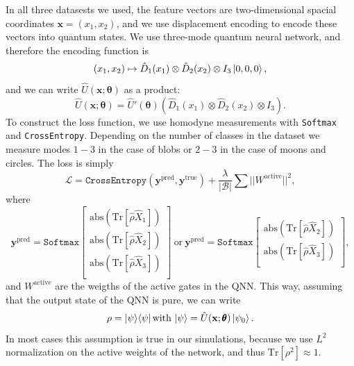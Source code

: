 \documentclass[12pt, a4paper,  nobibnotes]{article}
\newcommand{\op}[1]{\hat{#1}}
\newcommand{\ketbra}[2]{|#1\rangle\langle#2|}
\newcommand{\Tr}[1]{\mathrm{Tr}\left[#1\right]}
\begin{document}
In all three datasests we used, the feature vectors are two-dimensional spacial coordinates
$\mathbf x = (x_1,x_2)$, and we use displacement encoding to encode these vectors into quantum states.
We use three-mode quantum neural network, and therefore the encoding function is 
\begin{equation}
    (x_1, x_2) \mapsto \op D_1(x_1)\otimes\op D_2(x_2)\otimes I_3 \ket{0,0,0},
\end{equation}
and we can write $\op U(\mathbf x; \pmb\theta)$ as a product:
\begin{equation}
    \op U(\mathbf x; \pmb\theta) = \op U'(\pmb\theta)\left(\op D_1(x_1)\otimes\op D_2(x_2)\otimes I_3\right).
\end{equation}
To construct the loss function, we use homodyne measurements with \texttt{Softmax} and \texttt{CrossEntropy}.
Depending on the number of classes in the dataset we measure modes $1-3$ in the case of blobs
or $2-3$ in the case of moons and circles.
The loss is simply
\begin{equation}
    \mathcal L =  \texttt{CrossEntropy}(\mathbf y^{\textrm{pred}}, \mathbf y^{\textrm{true}}) + \frac{\lambda}{|\mathcal B|}\sum||W^{\textrm{active}}||^2,
\end{equation}
where
\begin{equation}
    \mathbf y^{\textrm{pred}} = \texttt{Softmax}\begin{bmatrix}
        \textrm{abs}\left(\Tr{\op\rho \op X_1}\right) \\[6.5pt]
        \textrm{abs}\left(\Tr{\op\rho \op X_2}\right) \\[6.5pt]
        \textrm{abs}\left(\Tr{\op\rho \op X_3}\right) \\[6.5pt]
    \end{bmatrix}~\textrm{or}~
    \mathbf y^{\textrm{pred}} = \texttt{Softmax}\begin{bmatrix}
        \textrm{abs}\left(\Tr{\op\rho \op X_2}\right) \\[6.5pt]
        \textrm{abs}\left(\Tr{\op\rho \op X_3}\right) \\[6.5pt]
    \end{bmatrix},
\end{equation}
and $W^{\textrm{active}}$ are the weigths of the active gates in the QNN. 
This way, assuming that the output state of the QNN is pure, we can write
\begin{equation}
    \rho = \ketbra{\psi}{\psi}\, \textrm{with}\, \ket\psi = \op U(\mathbf x; \pmb\theta)\ket{\psi_0}.
\end{equation}
In most cases this assumption is true in our simulations, because we use $L^2$ normalization
on the active weights of the network, and thus $\Tr{\rho^2}\approx 1$.
\end{document}
